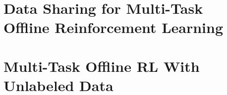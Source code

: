 \documentclass[../thesis.tex]{subfiles}
\begin{document}
\section{Data Sharing for Multi-Task Offline Reinforcement Learning}    
\label{sec:cds_section}


% 



% 




    
    


\section{Multi-Task Offline RL With Unlabeled Data}
\label{sec:uds_section}
\end{document}

